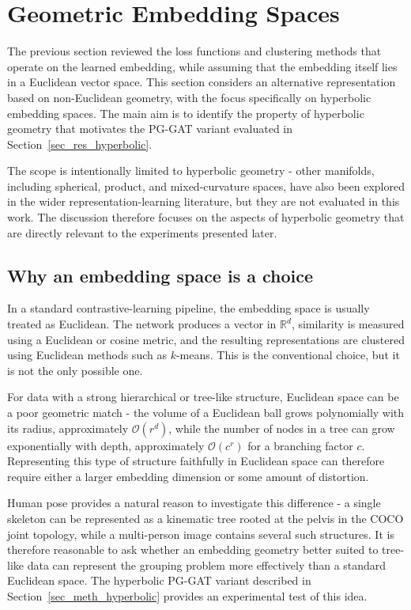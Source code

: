 \section{Geometric Embedding Spaces}
\label{sec_lit_geometry}

The previous section reviewed the loss functions and clustering methods that operate on the learned embedding,
while assuming that the embedding itself lies in a Euclidean vector space.
This section considers an alternative representation based on non-Euclidean geometry,
with the focus specifically on hyperbolic embedding spaces.
The main aim is to identify the property of hyperbolic geometry
that motivates the PG-GAT variant evaluated in Section~\ref{sec_res_hyperbolic}.

The scope is intentionally limited to hyperbolic geometry -
other manifolds, including spherical, product, and mixed-curvature spaces,
have also been explored in the wider representation-learning literature,
but they are not evaluated in this work.
The discussion therefore focuses on the aspects of hyperbolic geometry
that are directly relevant to the experiments presented later.

\subsection{Why an embedding space is a choice}
\label{sec_lit_geometry_choice}

In a standard contrastive-learning pipeline, the embedding space is usually treated as Euclidean.
The network produces a vector in $\mathbb{R}^{d}$,
similarity is measured using a Euclidean or cosine metric,
and the resulting representations are clustered using Euclidean methods such as $k$-means.
This is the conventional choice, but it is not the only possible one.

For data with a strong hierarchical or tree-like structure,
Euclidean space can be a poor geometric match -
the volume of a Euclidean ball grows polynomially with its radius, approximately $\mathcal{O}(r^{d})$,
while the number of nodes in a tree can grow exponentially with depth,
approximately $\mathcal{O}(c^{r})$ for a branching factor $c$.
Representing this type of structure faithfully in Euclidean space
can therefore require either a larger embedding dimension or some amount of distortion.

Human pose provides a natural reason to investigate this difference -
a single skeleton can be represented as a kinematic tree rooted at the pelvis in the COCO joint topology,
while a multi-person image contains several such structures.
It is therefore reasonable to ask
whether an embedding geometry better suited to tree-like data
can represent the grouping problem more effectively than a standard Euclidean space.
The hyperbolic PG-GAT variant described in Section~\ref{sec_meth_hyperbolic}
provides an experimental test of this idea.

